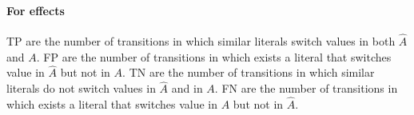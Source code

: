 \documentclass[letterpaper]{article} %
\begin{document}
\paragraph{For effects} 
TP are the number of transitions in which similar literals switch values in both $\hat{A}$ and $A$.
FP are the number of transitions in which exists a literal that switches value in $\hat{A}$ but not in $A$. 
TN are the number of transitions in which similar literals do not switch values in $\hat{A}$ and in $A$. 
FN are the number of transitions in which exists a literal that switches value in $A$ but not in $\hat{A}$.

\end{document}
